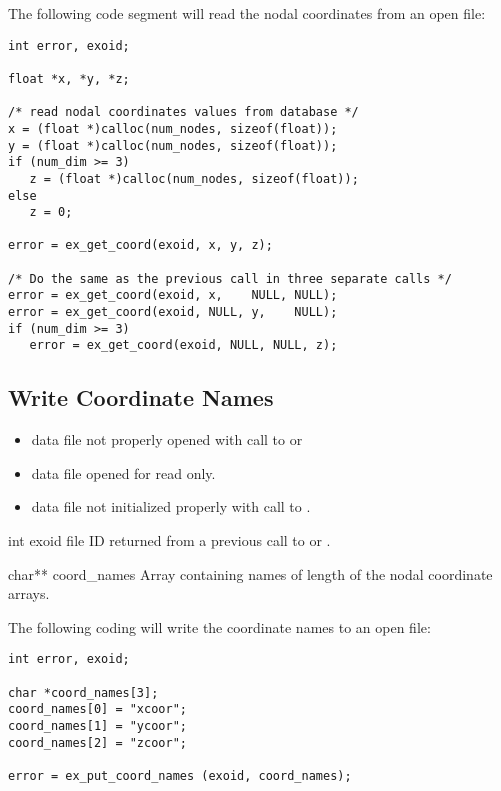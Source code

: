 The following code segment will read the nodal coordinates 
from an open \exo{} file:

\begin{lstlisting}
int error, exoid;

float *x, *y, *z;

/* read nodal coordinates values from database */
x = (float *)calloc(num_nodes, sizeof(float));
y = (float *)calloc(num_nodes, sizeof(float));
if (num_dim >= 3)
   z = (float *)calloc(num_nodes, sizeof(float));
else
   z = 0;

error = ex_get_coord(exoid, x, y, z);

/* Do the same as the previous call in three separate calls */
error = ex_get_coord(exoid, x,    NULL, NULL);
error = ex_get_coord(exoid, NULL, y,    NULL);
if (num_dim >= 3)
   error = ex_get_coord(exoid, NULL, NULL, z);
\end{lstlisting}


\subsection{Write Coordinate Names}

\begin{itemize}
 \item data file not properly opened with call to 
 or 

 \item data file opened for read only.

 \item data file not initialized properly with call to
 .
\end{itemize}


\begin{parameters}
\item[{int exoid \R{}}]
\exo{} file ID returned from a previous call to  
or .

\item[{char** coord_names \R{}}]
Array containing  names of length  
of the nodal coordinate arrays.
\end{parameters}

The following coding will write the coordinate names to an 
open \exo{} file:

\begin{lstlisting}
int error, exoid;

char *coord_names[3];
coord_names[0] = "xcoor";
coord_names[1] = "ycoor";
coord_names[2] = "zcoor";

error = ex_put_coord_names (exoid, coord_names);
\end{lstlisting}

